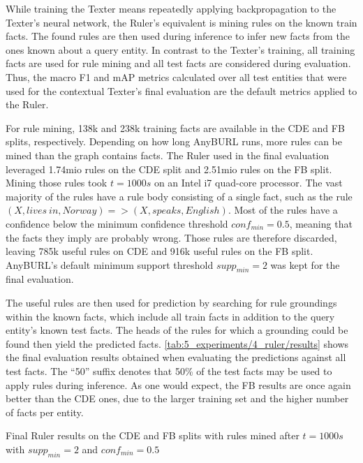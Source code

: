 While training the Texter means repeatedly applying backpropagation to the Texter's neural network, the Ruler's equivalent is mining rules on the known train facts. The found rules are then used during inference to infer new facts from the ones known about a query entity. In contrast to the Texter's training, all training facts are used for rule mining and all test facts are considered during evaluation. Thus, the macro F1 and mAP metrics calculated over all test entities that were used for the contextual Texter's final evaluation are the default metrics applied to the Ruler.

For rule mining, 138k and 238k training facts are available in the CDE and FB splits, respectively. Depending on how long AnyBURL runs, more rules can be mined than the graph contains facts. The Ruler used in the final evaluation leveraged 1.74mio rules on the CDE split and 2.51mio rules on the FB split. Mining those rules took $t = 1000s$ on an Intel i7 quad-core processor. The vast majority of the rules have a rule body consisting of a single fact, such as the rule $(X, lives~in, Norway) => (X, speaks, English)$. Most of the rules have a confidence below the minimum confidence threshold $conf_{min} = 0.5$, meaning that the facts they imply are probably wrong. Those rules are therefore discarded, leaving 785k useful rules on CDE and 916k useful rules on the FB split. AnyBURL's default minimum support threshold $supp_{min} = 2$ was kept for the final evaluation.

The useful rules are then used for prediction by searching for rule groundings within the known facts, which include all train facts in addition to the query entity's known test facts. The heads of the rules for which a grounding could be found then yield the predicted facts. \autoref{tab:5_experiments/4_ruler/results} shows the final evaluation results obtained when evaluating the predictions against all test facts. The ``50'' suffix denotes that 50\% of the test facts may be used to apply rules during inference. As one would expect, the FB results are once again better than the CDE ones, due to the larger training set and the higher number of facts per entity.

\begin{table}[h]
    \centering
    
    \caption{Final Ruler results on the CDE and FB splits with rules mined after $t = 1000s$ with $supp_{min} = 2$ and $conf_{min} = 0.5$}
    \label{tab:5_experiments/4_ruler/results}
\end{table}


